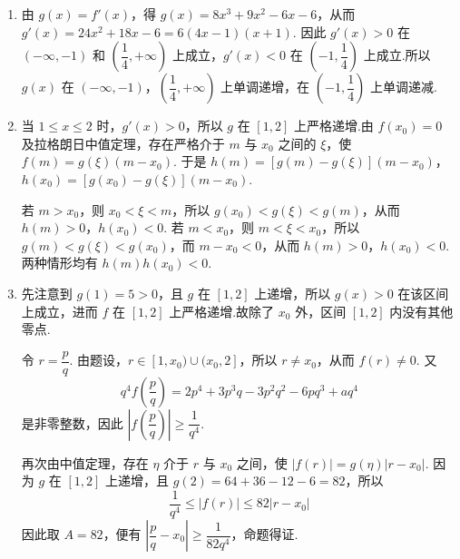 \begin{solution}
\begin{enumerate}
\item 由 \(g(x)=f'(x)\)，得 \(g(x)=8x^3+9x^2-6x-6\)，从而
\(g'(x)=24x^2+18x-6=6(4x-1)(x+1)\). 因此 \(g'(x)>0\) 在
\((-\infty,-1)\) 和 \(\left(\dfrac14,+\infty\right)\) 上成立，\(g'(x)<0\) 在
\(\left(-1,\dfrac14\right)\) 上成立.所以 \(g(x)\) 在
\((-\infty,-1)\)，\(\left(\dfrac14,+\infty\right)\) 上单调递增，在
\(\left(-1,\dfrac14\right)\) 上单调递减.

\item 当 \(1\leq x\leq2\) 时，\(g'(x)>0\)，所以 \(g\) 在 \([1,2]\) 上严格递增.由 \(f(x_0)=0\) 及拉格朗日中值定理，存在严格介于 \(m\) 与 \(x_0\) 之间的 \(\xi\)，使
\(f(m)=g(\xi)(m-x_0)\). 于是
\(h(m)=[g(m)-g(\xi)](m-x_0)\)，
\(h(x_0)=[g(x_0)-g(\xi)](m-x_0)\).

若 \(m>x_0\)，则 \(x_0<\xi<m\)，所以 \(g(x_0)<g(\xi)<g(m)\)，从而
\(h(m)>0\)，\(h(x_0)<0\). 若 \(m<x_0\)，则 \(m<\xi<x_0\)，所以
\(g(m)<g(\xi)<g(x_0)\)，而 \(m-x_0<0\)，从而 \(h(m)>0\)，\(h(x_0)<0\). 两种情形均有
\(h(m)h(x_0)<0\).

\item 先注意到 \(g(1)=5>0\)，且 \(g\) 在 \([1,2]\) 上递增，所以 \(g(x)>0\) 在该区间上成立，进而 \(f\) 在 \([1,2]\) 上严格递增.故除了 \(x_0\) 外，区间 \([1,2]\) 内没有其他零点.

令 \(r=\dfrac pq\). 由题设，\(r\in[1,x_0)\cup(x_0,2]\)，所以 \(r\neq x_0\)，从而 \(f(r)\neq0\). 又
\[
q^4f\left(\frac pq\right)=2p^4+3p^3q-3p^2q^2-6pq^3+aq^4
\]
是非零整数，因此 \(\left|f\left(\dfrac pq\right)\right|\geq\dfrac1{q^4}\).

再次由中值定理，存在 \(\eta\) 介于 \(r\) 与 \(x_0\) 之间，使
\(\left|f(r)\right|=g(\eta)|r-x_0|\). 因为 \(g\) 在 \([1,2]\) 上递增，且
\(g(2)=64+36-12-6=82\)，所以
\[
\frac1{q^4}\leq\left|f(r)\right|\leq82\left|r-x_0\right|
\]
因此取 \(A=82\)，便有
\(\left|\dfrac pq-x_0\right|\geq\dfrac1{82q^4}\)，命题得证.
\end{enumerate}
\end{solution}
